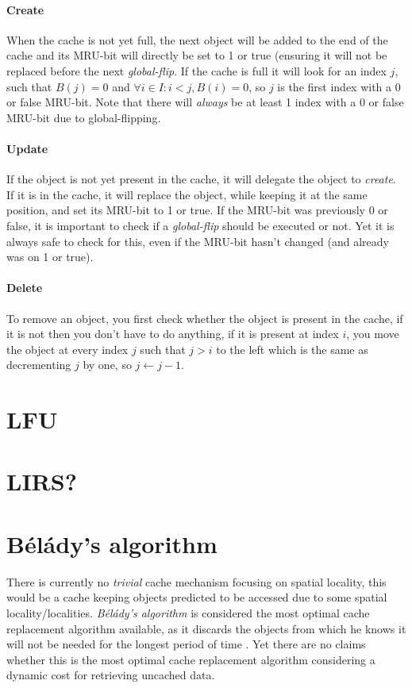 \documentclass[pdftex,a4paper,12pt,twoside]{report}
\begin{document}
\paragraph{Create} When the cache is not yet full, the next object will be added to the end of the cache and its MRU-bit will directly be set to 1 or true (ensuring it will not 
be replaced before the next \emph{global-flip}. If the cache is full it will look for an index $j$, such that $B(j) = 0$ and $\forall i \in I : i < j, B(i) = 0$, so $j$ is the first index with a 0 or false MRU-bit. Note that there will \emph{always} be at least 1 index with a 0 or false MRU-bit due to global-flipping.
\paragraph{Update} If the object is not yet present in the cache, it will delegate the object to \emph{create}. If it is in the cache, it will replace the object, while keeping it at the same position, and set its MRU-bit to 1 or true. If the MRU-bit was previously 0 or false, it is important to check if a \emph{global-flip} should be executed or not. Yet it is always safe to check for this, even if the MRU-bit hasn't changed (and already was on 1 or true).
\paragraph{Delete} To remove an object, you first check whether the object is present in the cache, if it is not then you don't have to do anything, if it is present at index $i$, you move the object at every index $j$ such that $j > i$ to the left which is the same as decrementing $j$ by one, so $j \leftarrow j - 1$.
\citep{guan2014wcet}
\section{LFU}
\section{LIRS?}
\section{Bélády's algorithm}
There is currently no \emph{trivial} cache mechanism focusing on spatial locality, this would be a cache keeping objects predicted to be accessed due to some spatial locality/localities. \emph{Bélády's algorithm} is considered the most optimal cache replacement algorithm available, as it discards the objects from which he knows it will not be needed for the longest period of time \citep{cache-algorithm-lru-belady}. Yet there are no claims whether this is the most optimal cache replacement algorithm considering a dynamic cost for retrieving uncached data.
\end{document}

